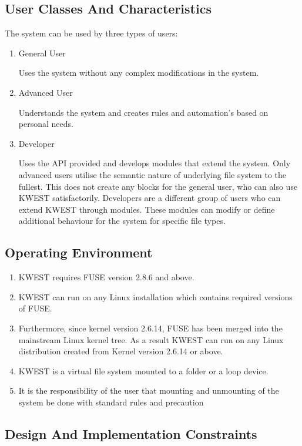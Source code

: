 \subsection{User Classes And Characteristics} 

The system can be used by three types of users:
\begin{enumerate}
\item General User 

Uses the system without any complex modifications in the system.
\item Advanced User 

Understands the system and creates rules and automation’s based on personal needs.
\item Developer 

Uses the API provided and develops modules that extend the system.
Only advanced users utilise the semantic nature of underlying file system to the fullest.
This does not create any blocks for the general user, who can also use KWEST satisfactorily.
Developers are a different group of users who can extend KWEST through modules. These
modules can modify or define additional behaviour for the system for specific file types.
\end{enumerate}

\subsection{Operating Environment}\begin{enumerate}
\item  KWEST requires FUSE \cite{FUSE} version 2.8.6 and above.

\item KWEST can run on any Linux installation which contains required versions of FUSE.
\item  Furthermore, since kernel version 2.6.14, FUSE has been merged into the
mainstream Linux kernel tree. As a result KWEST can run on any Linux distribution
created from Kernel version 2.6.14 or above.

\item KWEST is a virtual file system mounted to a folder or a loop device.
\item It is the responsibility of the user that mounting and unmounting of the system be
done with standard rules and precaution

\end{enumerate}

\subsection{Design And Implementation Constraints}

